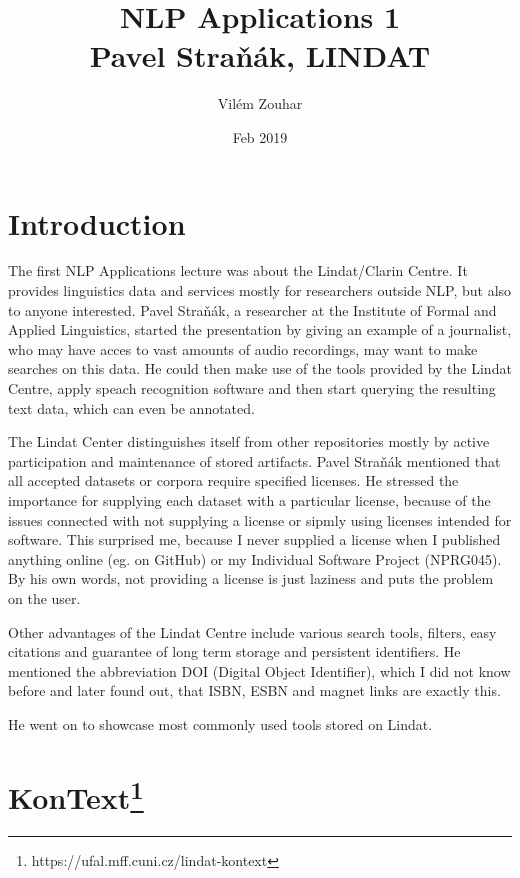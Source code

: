 \documentclass[a4paper]{article}
\begin{document}
\title{NLP Applications 1\\Pavel Straňák, LINDAT}
\author{Vilém Zouhar}
\date{Feb 2019}
\maketitle 

\section*{Introduction}

The first NLP Applications lecture was about the Lindat/Clarin Centre. It provides linguistics data and services mostly for researchers outside NLP, but also to anyone interested. Pavel Straňák, a researcher at the Institute of Formal and Applied Linguistics, started the presentation by giving an example of a journalist, who may have acces to vast amounts of audio recordings, may want to make searches on this data. He could then make use of the tools provided by the Lindat Centre, apply speach recognition software and then start querying the resulting text data, which can even be annotated.

The Lindat Center distinguishes itself from other repositories mostly by active participation and maintenance of stored artifacts. Pavel Straňák mentioned that all accepted datasets or corpora require specified licenses. He stressed the importance for supplying each dataset with a particular license, because of the issues connected with not supplying a license or sipmly using licenses intended for software. This surprised me, because I never supplied a license when I published anything online (eg. on GitHub) or my Individual Software Project (NPRG045). By his own words, not providing a license is just laziness and puts the problem on the user.

Other advantages of the Lindat Centre include various search tools, filters, easy citations and guarantee of long term storage and persistent identifiers. He mentioned the abbreviation DOI (Digital Object Identifier), which I did not know before and later found out, that ISBN, ESBN and magnet links are exactly this. 

He went on to showcase most commonly used tools stored on Lindat.

\section*{KonText\footnote{https://ufal.mff.cuni.cz/lindat-kontext}}
\end{document}
